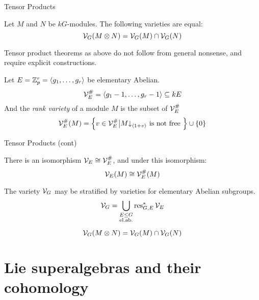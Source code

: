 \documentclass[handout]{beamer}
\begin{document}
    \begin{frame}{Tensor Products}
      \begin{theorem}
        Let $M$ and $N$ be $kG$-modules. The following varieties are equal:
        \[
          \mathcal{V}_G(M \otimes N) = \mathcal{V}_G(M) \cap \mathcal{V}_G(N)
        \]
      \end{theorem}
      Tensor product theorems as above do not follow from general nonsense, and require explicit constructions.
      \begin{definition}
        Let $E = \mathbb{Z}_p^r = \left< g_1,\ldots,g_r\right>$ be elementary Abelian.
        \[
          \mathcal{V}_E^\# = \left<g_1 - 1, \ldots, g_r - 1\right> \subseteq kE
        \]
        And the \emph{rank variety} of a module $M$ is the subset of $\mathcal{V}_E^\#$
        \[
          \mathcal{V}_E^\#(M) = \left\{ v \in \mathcal{V}_E^\# \big| M\mathord{\downarrow}_{\left<1 + v\right>} \text{ is not free }  \right\} \cup \left\{ 0 \right\}
        \]
        
      \end{definition}
    \end{frame}

    \begin{frame}{Tensor Products (cont)}
      \begin{theorem}
        There is an isomorphism $\mathcal{V}_E \cong \mathcal{V}_E^\#$, and under this isomorphism:
        \[
          \mathcal{V}_E(M) \cong \mathcal{V}_E^\#(M)
        \]
      \end{theorem}
      \begin{theorem}[Quillen]
        The variety $\mathcal{V}_G$ may be stratified by varieties for elementary Abelian subgroups.
        \[
          \mathcal{V}_G = \bigcup_{\substack{E \leq G \\ \text{el.ab.}}} \operatorname{res}_{G,E}^* \mathcal{V}_E
        \]
      \end{theorem}
      \begin{corollary}
        \[\mathcal{V}_G(M \otimes N) = \mathcal{V}_G(M) \cap \mathcal{V}_G(N)\]
      \end{corollary}
    \end{frame}
\section[LSAs \& $\H^\bullet$]{Lie superalgebras and their cohomology}
\end{document}
